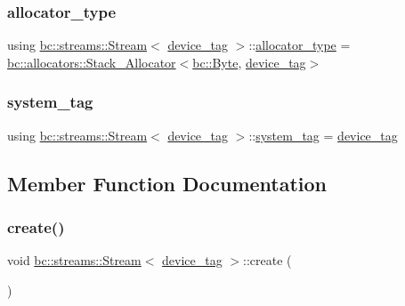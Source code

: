 \subsubsection{\texorpdfstring{allocator\+\_\+type}{allocator\_type}}
{\footnotesize\ttfamily using \hyperlink{classbc_1_1streams_1_1Stream}{bc\+::streams\+::\+Stream}$<$ \hyperlink{structbc_1_1device__tag}{device\+\_\+tag} $>$\+::\hyperlink{classbc_1_1streams_1_1Stream_3_01device__tag_01_4_ad6e752fa317da0549e72b1d5118887ee}{allocator\+\_\+type} =  \hyperlink{classbc_1_1allocators_1_1Stack__Allocator}{bc\+::allocators\+::\+Stack\+\_\+\+Allocator}$<$\hyperlink{classbc_1_1allocators_1_1Byte}{bc\+::\+Byte}, \hyperlink{structbc_1_1device__tag}{device\+\_\+tag}$>$}

\mbox{\label{classbc_1_1streams_1_1Stream_3_01device__tag_01_4_a03675e8b1fac42f89e8ef8b7fc6db22b}} 
\subsubsection{\texorpdfstring{system\+\_\+tag}{system\_tag}}
{\footnotesize\ttfamily using \hyperlink{classbc_1_1streams_1_1Stream}{bc\+::streams\+::\+Stream}$<$ \hyperlink{structbc_1_1device__tag}{device\+\_\+tag} $>$\+::\hyperlink{classbc_1_1streams_1_1Stream_3_01device__tag_01_4_a03675e8b1fac42f89e8ef8b7fc6db22b}{system\+\_\+tag} =  \hyperlink{structbc_1_1device__tag}{device\+\_\+tag}}



\subsection{Member Function Documentation}
\mbox{\label{classbc_1_1streams_1_1Stream_3_01device__tag_01_4_af8e8fb55779a89aec8ba132e25dc7a1d}} 
\subsubsection{\texorpdfstring{create()}{create()}}
{\footnotesize\ttfamily void \hyperlink{classbc_1_1streams_1_1Stream}{bc\+::streams\+::\+Stream}$<$ \hyperlink{structbc_1_1device__tag}{device\+\_\+tag} $>$\+::create (\begin{DoxyParamCaption}{ }\end{DoxyParamCaption})\hspace{0.3cm}{\ttfamily [inline]}}

